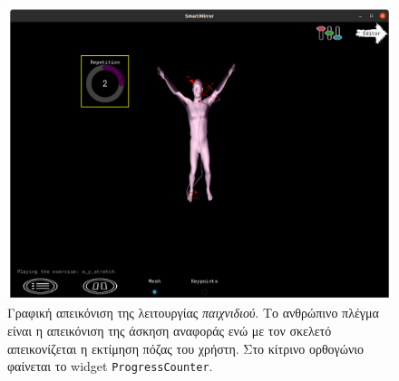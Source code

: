 \begin{figure}[H]
	\centering
	\includegraphics[scale=0.38]{images/chapter5/playing_action.png}
	\caption{Γραφική απεικόνιση της λειτουργίας \textsl{παιχνιδιού}. Το ανθρώπινο πλέγμα είναι η απεικόνιση της άσκηση αναφοράς ενώ με τον σκελετό απεικονίζεται η εκτίμηση πόζας του χρήστη. Στο κίτρινο ορθογώνιο φαίνεται το widget \texttt{ProgressCounter}.}
	\label{fig:play_action}
\end{figure}

